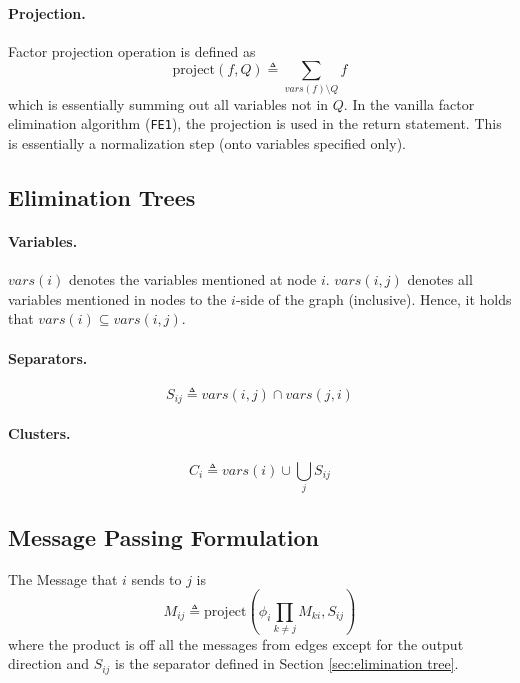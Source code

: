 \documentclass[11pt]{article}
\begin{document}
\paragraph{Projection.} Factor projection operation is defined as 
\begin{equation}
	\mathrm {project} (f, Q) \triangleq \sum_{vars(f) \setminus Q} f
\end{equation}
which is essentially summing out all variables not in $Q$. In the vanilla factor elimination algorithm (\texttt{FE1}), the projection is used in the return statement. This is essentially a normalization step (onto variables specified only).

\subsection{Elimination Trees\label{sec:elimination tree}}
\paragraph{Variables.}
$vars(i)$ denotes the variables mentioned at node $i$. $vars(i, j)$ denotes all variables mentioned in nodes to the $i$-side of the graph (inclusive). Hence, it holds that $vars(i) \subseteq vars(i, j)$.

\paragraph{Separators.} 
\begin{equation}
	S_{ij} \triangleq vars(i, j) \cap vars(j, i)
\end{equation}

\paragraph{Clusters.} 
\begin{equation}
	C_i \triangleq vars(i) \cup \bigcup_j S_{ij}
\end{equation}

\subsection{Message Passing Formulation}
The Message that $i$ sends to $j$ is 
\begin{equation}
	M_{ij} \triangleq \mathrm{project} \left( \phi_i \prod_{k \neq j } M_{ki}, S_{ij} \right) 
\end{equation}
where the product is off all the messages from edges except for the output direction and $S_{ij}$ is the separator defined in Section \ref{sec:elimination tree}.
\end{document}
